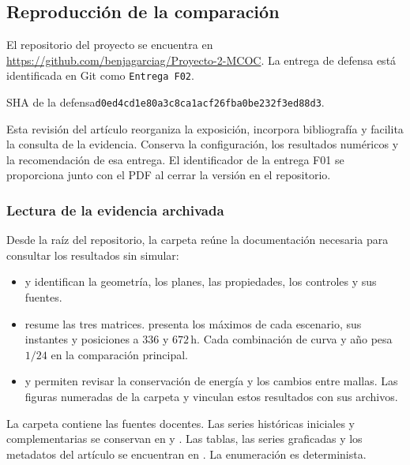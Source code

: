 \subsection{Reproducción de la comparación}
\label{an:reproduccion}

El repositorio del proyecto se encuentra en \url{https://github.com/benjagarciag/Proyecto-2-MCOC}. La entrega de defensa está identificada en Git como \texttt{Entrega F02}.

\noindent SHA de la defensa\quad\texttt{d0ed4cd1e80a3c8ca1acf26fba0be232f3ed88d3}.

 Esta revisión del artículo reorganiza la exposición, incorpora bibliografía y facilita la consulta de la evidencia. Conserva la configuración, los resultados numéricos y la recomendación de esa entrega. El identificador de la entrega F01 se proporciona junto con el PDF al cerrar la versión en el repositorio.

\subsubsection{Lectura de la evidencia archivada}

Desde la raíz del repositorio, la carpeta  reúne la documentación necesaria para consultar los resultados sin simular:
\begin{itemize}
\item {} y  identifican la geometría, los planes, las propiedades, los controles y sus fuentes.
\item {} resume las tres matrices.  presenta los máximos de cada escenario, sus instantes y posiciones a $336$ y $672\,\mathrm h$. Cada combinación de curva y año pesa $1/24$ en la comparación principal.
\item {} y  permiten revisar la conservación de energía y los cambios entre mallas. Las figuras numeradas de la carpeta y  vinculan estos resultados con sus archivos.
\end{itemize}
La carpeta  contiene las fuentes docentes. Las series históricas iniciales y complementarias se conservan en  y . Las tablas, las series graficadas y los metadatos del artículo se encuentran en . La enumeración es determinista.

